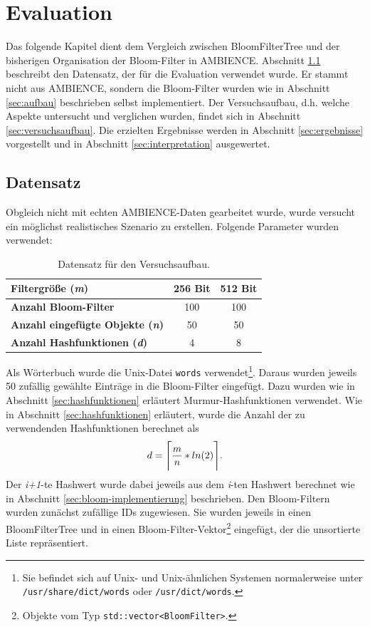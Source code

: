 \chapter{Evaluation}\label{ch:evaluation}
Das folgende Kapitel dient dem Vergleich zwischen BloomFilterTree und der bisherigen Organisation der Bloom-Filter in AMBIENCE. Abschnitt \ref{sec:datensatz} beschreibt den Datensatz, der für die Evaluation verwendet wurde. Er stammt nicht aus AMBIENCE, sondern die Bloom-Filter wurden wie in Abschnitt \ref{sec:aufbau} beschrieben selbst implementiert. Der Versuchsaufbau, d.h. welche Aspekte untersucht und verglichen wurden, findet sich in Abschnitt \ref{sec:versuchsaufbau}. Die erzielten Ergebnisse werden in Abschnitt \ref{sec:ergebnisse} vorgestellt und in Abschnitt \ref{sec:interpretation} ausgewertet.
\section{Datensatz}\label{sec:datensatz}
Obgleich nicht mit echten AMBIENCE-Daten gearbeitet wurde, wurde versucht ein möglichst realistisches Szenario zu erstellen. Folgende Parameter wurden verwendet:
\begin{center}
\begin{table}[htbp]
{\small
\begin{center}
\begin{tabular}[center]{lcc}
\toprule
\textbf{Filtergröße (\textit{m})} & 256 Bit & 512 Bit\\
\midrule
\textbf{Anzahl Bloom-Filter} & 100 & 100\\
\midrule
\textbf{Anzahl eingefügte Objekte (\textit{n})} & 50 & 50\\
\midrule
\textbf{Anzahl Hashfunktionen (\textit{d})} & 4 & 8\\
\bottomrule
\end{tabular}
\end{center}
} %
\caption[Datensatz für den Versuchsaufbau]{Datensatz für den Versuchsaufbau.\label{tab:Datensatz}}
\end{table}
\end{center}
Als Wörterbuch wurde die Unix-Datei \texttt{words} verwendet\footnote{Sie befindet sich auf Unix- und Unix-ähnlichen Systemen normalerweise unter \texttt{/usr/share/dict/words} oder \texttt{/usr/dict/words}.}. Daraus wurden jeweils 50 zufällig gewählte Einträge in die Bloom-Filter eingefügt. Dazu wurden wie in Abschnitt \ref{sec:hashfunktionen} erläutert Murmur-Hashfunktionen verwendet. Wie in Abschnitt \ref{sec:hashfunktionen} erläutert, wurde die Anzahl der zu verwendenden Hashfunktionen berechnet als 
\[d = \Ceil[\Bigg]{\frac{m}{n} * ln(2)}.\]
\noindent
Der \textit{i+1}-te Hashwert wurde dabei jeweils aus dem \textit{i}-ten Hashwert berechnet wie in Abschnitt \ref{sec:bloom-implementierung} beschrieben. Den Bloom-Filtern wurden zunächst zufällige IDs zugewiesen. Sie wurden jeweils in einen BloomFilterTree und in einen Bloom-Filter-Vektor\footnote{Objekte vom Typ \texttt{std::vector<BloomFilter>}.} eingefügt, der die unsortierte Liste repräsentiert.
\newpage
